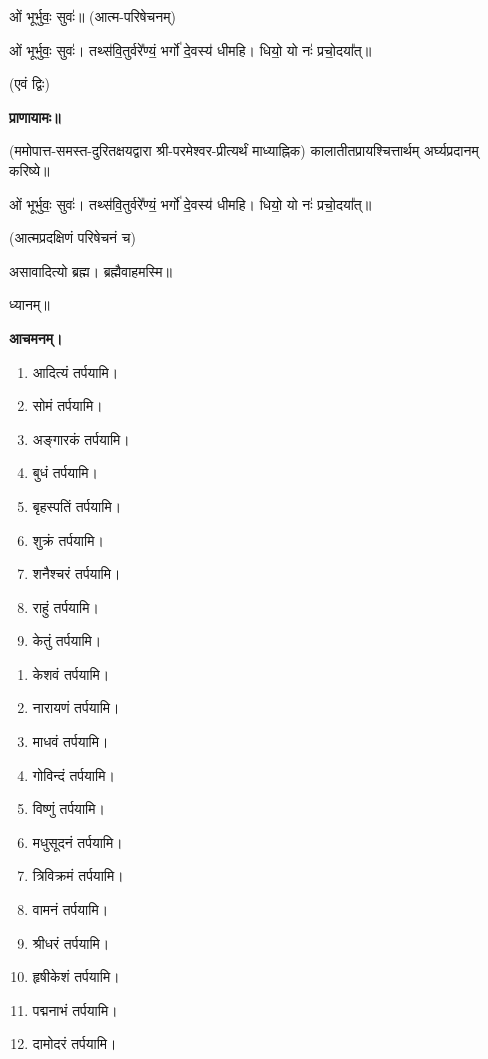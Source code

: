 ओं भूर्भुवः॒ सुवः॑॥ (आत्म-परिषेचनम्)



ओं भूर्भुवः॒ सुवः॑। तथ्स॑वि॒तुर्वरे᳚ण्यं॒ भर्गो॑ दे॒वस्य॑ धीमहि। धियो॒ यो नः॑ प्रचो॒दया᳚त्॥

\hfill{(एवं द्विः)}


\textbf{प्राणायामः॥}

(ममोपात्त-समस्त-दुरितक्षयद्वारा श्री-परमेश्वर-प्रीत्यर्थं माध्याह्निक)
कालातीतप्रायश्चित्तार्थम् अर्घ्यप्रदानम् करिष्ये॥

ओं भूर्भुवः॒ सुवः॑। तथ्स॑वि॒तुर्वरे᳚ण्यं॒ भर्गो॑ दे॒वस्य॑ धीमहि। धियो॒ यो नः॑ प्रचो॒दया᳚त्॥

(आत्मप्रदक्षिणं परिषेचनं च)


असावादित्यो ब्रह्म। ब्रह्मैवाहमस्मि॥

ध्यानम्॥

\textbf{आचमनम्।}



\begin{enumerate}
 \item आदित्यं तर्पयामि।
 \item सोमं तर्पयामि।
 \item अङ्गारकं तर्पयामि।
 \item बुधं तर्पयामि।
 \item बृहस्पतिं तर्पयामि।
 \item शुक्रं तर्पयामि।
 \item शनैश्चरं तर्पयामि।
 \item राहुं तर्पयामि।
 \item केतुं तर्पयामि।
\end{enumerate}


\begin{enumerate}
\item केशवं तर्पयामि।
\item नारायणं तर्पयामि।
\item माधवं तर्पयामि।
\item गोविन्दं तर्पयामि।
\item विष्णुं तर्पयामि।
\item मधुसूदनं तर्पयामि।
\item त्रिविक्रमं तर्पयामि।
\item वामनं तर्पयामि।
\item श्रीधरं तर्पयामि।
\item हृषीकेशं तर्पयामि।
\item पद्मनाभं तर्पयामि।
\item दामोदरं तर्पयामि।
\end{enumerate}

